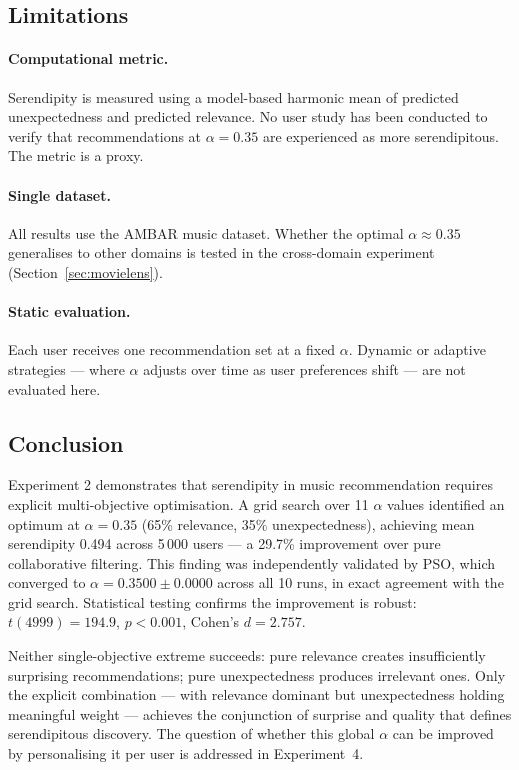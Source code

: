 \subsection{Limitations}

\paragraph{Computational metric.}
Serendipity is measured using a model-based harmonic mean of predicted
unexpectedness and predicted relevance.  No user study has been conducted
to verify that recommendations at $\alpha = 0.35$ are experienced as more
serendipitous.  The metric is a proxy.

\paragraph{Single dataset.}
All results use the AMBAR music dataset.  Whether the optimal $\alpha \approx
0.35$ generalises to other domains is tested in the cross-domain experiment
(Section~\ref{sec:movielens}).

\paragraph{Static evaluation.}
Each user receives one recommendation set at a fixed $\alpha$.  Dynamic or
adaptive strategies --- where $\alpha$ adjusts over time as user preferences
shift --- are not evaluated here.

\subsection{Conclusion}

Experiment 2 demonstrates that serendipity in music recommendation requires
explicit multi-objective optimisation.  A grid search over 11 $\alpha$ values
identified an optimum at $\alpha = 0.35$ (65\% relevance, 35\%
unexpectedness), achieving mean serendipity 0.494 across 5\,000 users ---
a 29.7\% improvement over pure collaborative filtering.  This finding was
independently validated by PSO, which converged to $\alpha = 0.3500 \pm
0.0000$ across all 10 runs, in exact agreement with the grid search.
Statistical testing confirms the improvement is robust: $t(4999) = 194.9$,
$p < 0.001$, Cohen's $d = 2.757$.

Neither single-objective extreme succeeds: pure relevance creates
insufficiently surprising recommendations; pure unexpectedness produces
irrelevant ones.  Only the explicit combination --- with relevance dominant
but unexpectedness holding meaningful weight --- achieves the conjunction of
surprise and quality that defines serendipitous discovery.  The question
of whether this global $\alpha$ can be improved by personalising it per
user is addressed in Experiment~4.
